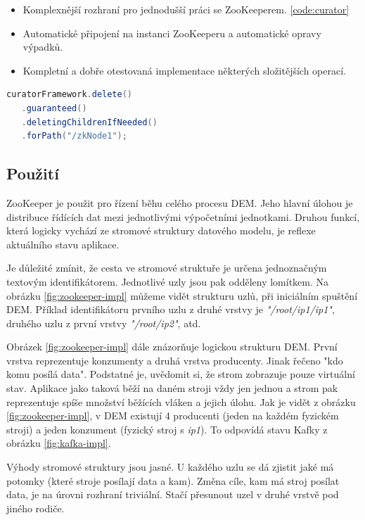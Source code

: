 \documentclass[
  digital, %
  table,   %
  nolof,     %
  nolot,     %
  twoside, %
  nocover,
  monochrome,
  12pt
]{fithesis3}
\begin{document}
\begin{itemize}
  \item Komplexnější rozhraní pro jednodušší práci se ZooKeeperem. \ref{code:curator}
  \item Automatické připojení na instanci ZooKeeperu a automatické opravy výpadků.
  \item Kompletní a dobře otestovaná implementace některých složitějších operací.
\end{itemize}

\begin{lstlisting}[label=code:curator,caption={Demonstrace jednoduchého použití aplikačního rámce Curator, na smazání uzlu \textit{zkNode1} a všech jeho potomků.},language=Java]
curatorFramework.delete()
   .guaranteed()
   .deletingChildrenIfNeeded()
   .forPath("/zkNode1");
\end{lstlisting}
 
\subsection*{Použití}
ZooKeeper je použit pro řízení běhu celého procesu DEM. Jeho hlavní úlohou je distribuce řídících dat mezi jednotlivými výpočetními jednotkami. Druhou funkcí, která logicky vychází ze stromové struktury datového modelu, je reflexe aktuálního stavu aplikace.

Je důležité zmínit, že cesta ve stromové struktuře je určena jednoznačným textovým identifikátorem. Jednotlivé uzly jsou pak odděleny lomítkem. Na obrázku \ref{fig:zookeeper-impl} můžeme vidět strukturu uzlů, při iniciálním spuštění DEM. Příklad identifikátoru prvního uzlu z druhé vrstvy je \textit{"/root/ip1/ip1"}, druhého uzlu z první vrstvy \textit{"/root/ip2"}, atd.

Obrázek \ref{fig:zookeeper-impl} dále znázorňuje logickou strukturu DEM. První vrstva reprezentuje konzumenty a druhá vrstva producenty. Jinak řečeno "kdo komu posílá data". Podstatné je, uvědomit si, že strom zobrazuje pouze virtuální stav. Aplikace jako taková běží na daném stroji vždy jen jednou a strom pak reprezentuje spíše množství běžících vláken a jejich úlohu. Jak je vidět z obrázku \ref{fig:zookeeper-impl}, v DEM existují 4 producenti (jeden na každém fyzickém stroji) a jeden konzument (fyzický stroj s \textit{ip1}). To odpovídá stavu Kafky z obrázku \ref{fig:kafka-impl}.

Výhody stromové struktury jsou jasné. U každého uzlu se dá zjistit jaké má potomky (které stroje posílají data a kam). Změna cíle, kam má stroj posílat data, je na úrovni rozhraní triviální. Stačí přesunout uzel v druhé vrstvě pod jiného rodiče.
\end{document}
